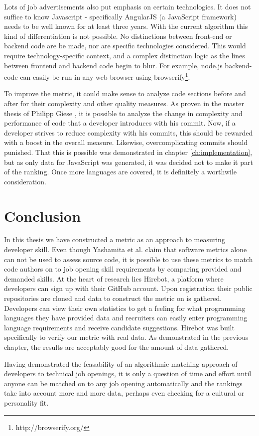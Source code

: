 Lots of job advertisements also put emphasis on certain technologies.
It does not suffice to know Javascript - specifically AngularJS (a JavaScript framework)
needs to be well known for at least three years.
With the current algorithm this kind of differentiation is not possible.
No distinctions between front-end or backend code are be made,
nor are specific technologies considered. This would require technology-specific
context, and a complex distinction logic as the lines between frontend
and backend code begin to blur. For example, node.js backend-code
can easily be run in any web browser using browserify\footnote{http://browserify.org/}.
\newline

To improve the metric, it could make sense to analyze code sections
before and after for their complexity and other quality measures.
As proven in the master thesis of Philipp Giese \cite{pg:2014},
it is possible to analyze the change in complexity and performance
of code that a developer introduces with his commit.
Now, if a developer strives to reduce complexity with his commits,
this should be rewarded with a boost in the overall measure.
Likewise, overcomplicating commits should punished.
That this is possible was demonstrated in chapter \ref{ch:implementation},
but as only data for JavaScript was generated, it was decided not to make
it part of the ranking. Once more languages are covered, it is definitely
a worthwile consideration.

\section{Conclusion}
In this thesis we have constructed a metric as an approach to measuring developer
skill. Even though Yashamita et al. claim that software metrics alone can not
be used to assess source code\cite{mlya:2012}, it is possible to use these metrics
to match code authors on to job opening skill requirements by comparing provided and demanded skills.
At the heart of research lies Hirebot, a platform where developers can sign up with their
GitHub account. Upon registration their public repositories are cloned and
data to construct the metric on is gathered.
Developers can view their own statistics to get a feeling for what programming
languages they have provided data and recruiters can easily
enter programming language requirements and receive candidate suggestions.
Hirebot was built specifically to verify our metric with real data.
As demonstrated in the previous chapter, the results are acceptably good for
the amount of data gathered.

Having demonstrated the feasability of an algorithmic matching approach
of developers to technical job openings, it is only a question of time and effort
until anyone can be matched on to any job opening automatically and the rankings
take into account more and more data, perhaps even checking for a cultural or
personality fit.